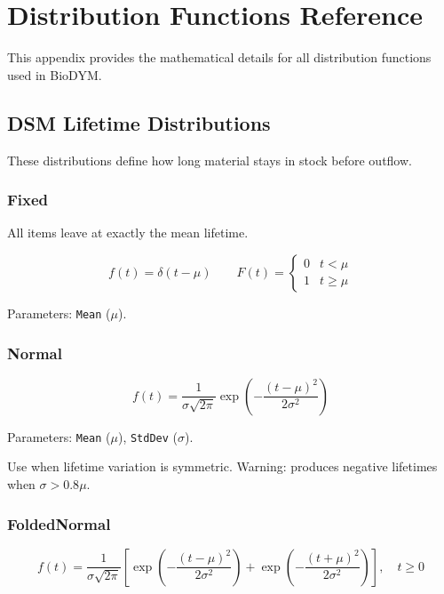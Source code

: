 \chapter{Distribution Functions Reference}
\label{ch:distributions}

This appendix provides the mathematical details for all distribution functions used in BioDYM.

\section{DSM Lifetime Distributions}

These distributions define how long material stays in stock before outflow.

\subsection{Fixed}

All items leave at exactly the mean lifetime.

\begin{equation}
  f(t) = \delta(t - \mu) \qquad F(t) = \begin{cases} 0 & t < \mu \\ 1 & t \geq \mu \end{cases}
\end{equation}

Parameters: \texttt{Mean} ($\mu$).

\subsection{Normal}

\begin{equation}
  f(t) = \frac{1}{\sigma\sqrt{2\pi}} \exp\left(-\frac{(t-\mu)^2}{2\sigma^2}\right)
\end{equation}

Parameters: \texttt{Mean} ($\mu$), \texttt{StdDev} ($\sigma$).

Use when lifetime variation is symmetric. Warning: produces negative lifetimes when $\sigma > 0.8\mu$.

\subsection{FoldedNormal}

\begin{equation}
  f(t) = \frac{1}{\sigma\sqrt{2\pi}} \left[\exp\left(-\frac{(t-\mu)^2}{2\sigma^2}\right) + \exp\left(-\frac{(t+\mu)^2}{2\sigma^2}\right)\right], \quad t \geq 0
\end{equation}

